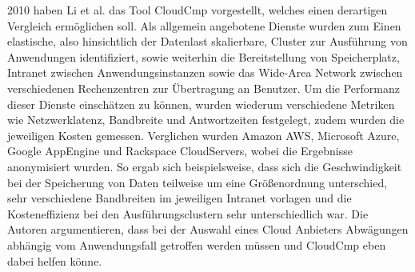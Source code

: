 %

2010 haben Li et al. das Tool CloudCmp vorgestellt\cite{li2010}, welches einen derartigen Vergleich ermöglichen soll. 
Als allgemein angebotene Dienste wurden zum Einen elastische, also hinsichtlich der Datenlast skalierbare, Cluster zur Ausführung von Anwendungen identifiziert, sowie weiterhin die Bereitstellung von Speicherplatz, Intranet zwischen Anwendungsinstanzen sowie das Wide-Area Network zwischen verschiedenen Rechenzentren zur Übertragung an Benutzer.
Um die Performanz dieser Dienste einschätzen zu können, wurden wiederum verschiedene Metriken wie Netzwerklatenz, Bandbreite und Antwortzeiten festgelegt, zudem wurden die jeweiligen Kosten gemessen.
Verglichen wurden Amazon AWS, Microsoft Azure, Google AppEngine und Rackspace CloudServers, wobei die Ergebnisse anonymisiert wurden. 
So ergab sich beispielsweise, dass sich die Geschwindigkeit bei der Speicherung von Daten teilweise um eine Größenordnung unterschied, sehr verschiedene Bandbreiten im jeweiligen Intranet vorlagen und die Kosteneffizienz bei den Ausführungsclustern sehr unterschiedlich war. 
Die Autoren argumentieren, dass bei der Auswahl eines Cloud Anbieters Abwägungen abhängig vom Anwendungsfall getroffen werden müssen und CloudCmp eben dabei helfen könne.

